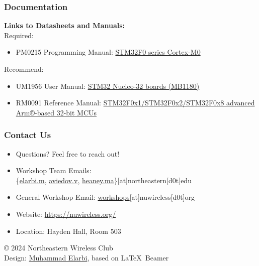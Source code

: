 \documentclass{beamer}
\begin{document}
\begin{frame}
    \frametitle{Documentation}
    \textbf{Links to Datasheets and Manuals:}\\
    Required:\\
    \begin{itemize}
        \item PM0215 Programming Manual: \href{https://www.st.com/resource/en/programming_manual/pm0215-stm32f0-series-cortexm0-programming-manual-stmicroelectronics.pdf} {STM32F0 series Cortex-M0}
    \end{itemize}
    Recommend:\\
    \begin{itemize}
        \item UM1956 User Manual: \href{https://www.st.com/resource/en/user_manual/dm00231744-stm32-nucleo-32-boards-mb1180-stmicroelectronics.pdf}{STM32 Nucleo-32 boards (MB1180)}
        \item RM0091 Reference Manual: \href{https://www.st.com/resource/en/reference_manual/rm0091-stm32f0x1stm32f0x2stm32f0x8-advanced-armbased-32bit-mcus-stmicroelectronics.pdf}{STM32F0x1/STM32F0x2/STM32F0x8 advanced Arm®-based 32-bit MCUs}
    \end{itemize}
\end{frame}
\begin{frame}
    \frametitle{Contact Us}
    \begin{itemize}
        \item Questions? Feel free to reach out!
        \item Workshop Team Emails: \\
        \{\href{mailto:elarbi.m@northeastern.edu}{elarbi.m}, 
        \href{mailto:aviedov.v@northeastern.edu}{aviedov.v}, 
        \href{mailto:heaney.ma@northeastern.edu}{heaney.ma}\}[at]northeastern[d0t]edu
        \item General Workshop Email: \href{mailto:workshops@nuwireless.org}{workshops}[at]nuwireless[d0t]org
        \item Website: \url{https://nuwireless.org/}
        \item Location: Hayden Hall, Room 503
    \end{itemize}
    \vspace{1cm}
    \begin{flushright}
        \footnotesize{© 2024 Northeastern Wireless Club} \\
        \footnotesize{Design: \href{https://melarbi.com}{Muhammad Elarbi}, based on \LaTeX\ Beamer}
    \end{flushright}
\end{frame}

\end{document}
